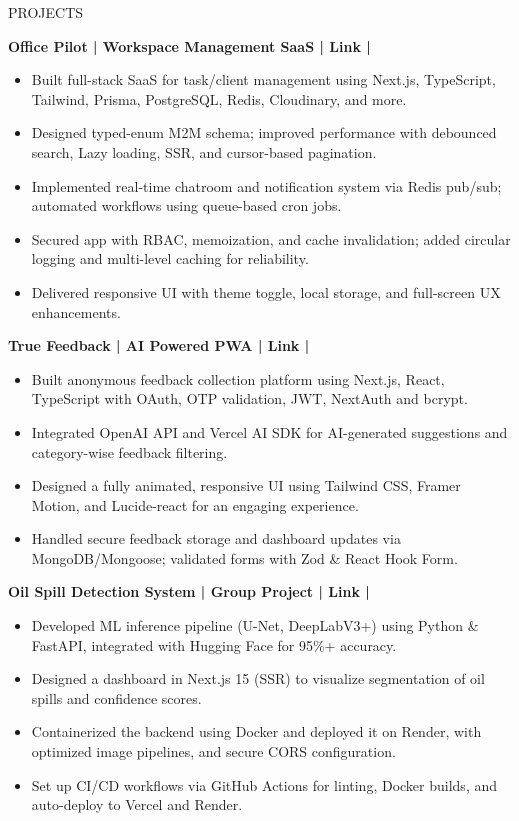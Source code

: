 \documentclass{resume} %
\begin{document}
\begin{rSection}{PROJECTS}
\vspace{-1.5em}
\item \textbf{Office Pilot | Workspace Management SaaS | Link |}
\begin{itemize}
    \itemsep -4pt {}
    \item Built full-stack SaaS for task/client management using Next.js, TypeScript, Tailwind, Prisma, PostgreSQL, Redis, Cloudinary, and more.
    \item Designed typed-enum M2M schema; improved performance with debounced search, Lazy loading, SSR, and cursor-based pagination.
    \item Implemented real-time chatroom and notification system via Redis pub/sub; automated workflows using queue-based cron jobs.
    \item Secured app with RBAC, memoization, and cache invalidation; added circular logging and multi-level caching for reliability.
    \item Delivered responsive UI with theme toggle, local storage, and full-screen UX enhancements.
\end{itemize}
\vspace{-0.5em}
\item \textbf{True Feedback | AI Powered PWA | Link |}
\begin{itemize}
    \itemsep -4pt {}
    \item Built anonymous feedback collection platform using Next.js, React, TypeScript with OAuth, OTP validation, JWT, NextAuth and bcrypt.
    \item Integrated OpenAI API and Vercel AI SDK for AI-generated suggestions and category-wise feedback filtering.
    \item Designed a fully animated, responsive UI using Tailwind CSS, Framer Motion, and Lucide-react for an engaging experience.
    \item Handled secure feedback storage and dashboard updates via MongoDB/Mongoose; validated forms with Zod \& React Hook Form.
\end{itemize}
\vspace{-0.5em}
\item \textbf{Oil Spill Detection System | Group Project | Link |}
\begin{itemize}
    \itemsep -4pt {}
    \item Developed ML inference pipeline (U-Net, DeepLabV3+) using Python \& FastAPI, integrated with Hugging Face for 95\%+ accuracy.
    \item Designed a dashboard in Next.js 15 (SSR) to visualize segmentation of oil spills and confidence scores.
    \item Containerized the backend using Docker and deployed it on Render, with optimized image pipelines, and secure CORS configuration.
    \item Set up CI/CD workflows via GitHub Actions for linting, Docker builds, and auto-deploy to Vercel and Render.
\end{itemize}
\end{rSection}
\end{document}

